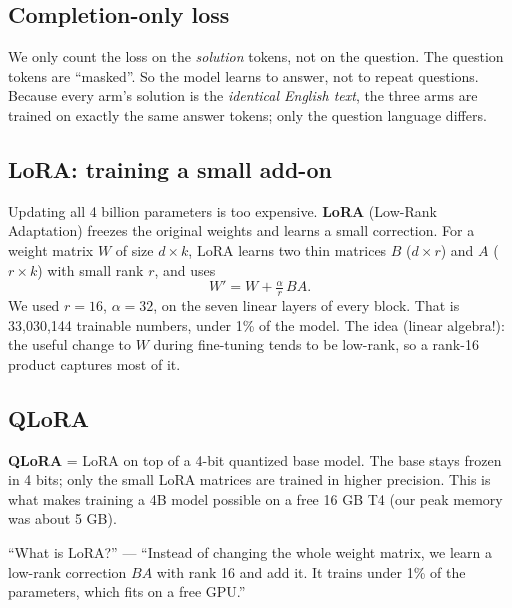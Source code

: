 \documentclass[11pt,a4paper]{article}
\begin{document}
\subsection{Completion-only loss}
We only count the loss on the \emph{solution} tokens, not on the question. The question tokens are ``masked''. So the model learns to answer, not to repeat questions. Because every arm's solution is the \emph{identical English text}, the three arms are trained on exactly the same answer tokens; only the question language differs.

\subsection{LoRA: training a small add-on}
Updating all 4 billion parameters is too expensive. \textbf{LoRA} (Low-Rank Adaptation) freezes the original weights and learns a small correction. For a weight matrix $W$ of size $d\times k$, LoRA learns two thin matrices $B$ ($d\times r$) and $A$ ($r\times k$) with small rank $r$, and uses
\[ W' = W + \tfrac{\alpha}{r}\,BA. \]
We used $r=16$, $\alpha=32$, on the seven linear layers of every block. That is 33{,}030{,}144 trainable numbers, under 1\% of the model. The idea (linear algebra!): the useful change to $W$ during fine-tuning tends to be low-rank, so a rank-16 product captures most of it.

\subsection{QLoRA}
\textbf{QLoRA} = LoRA on top of a 4-bit quantized base model. The base stays frozen in 4 bits; only the small LoRA matrices are trained in higher precision. This is what makes training a 4B model possible on a free 16 GB T4 (our peak memory was about 5 GB).

\begin{ifasked}
``What is LoRA?'' --- ``Instead of changing the whole weight matrix, we learn a low-rank correction $BA$ with rank 16 and add it. It trains under 1\% of the parameters, which fits on a free GPU.''
\end{ifasked}
\end{document}
